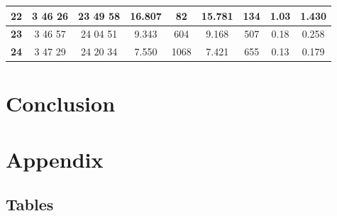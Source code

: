 \documentclass[12pt]{article}
\begin{document}
\begin{table}[H]
{\begin{tabular}{|c|c|c|c|c|c|c|c|c|}
        \textbf{22}   & 3  46  26                                                        & 23  49  58                                                         & 16.807     & 82                                                         & 15.781     & 134                                                        & 1.03         & 1.430                                                            \\ \hline
        \textbf{23}   & 3  46  57                                                        & 24  04  51                                                         & 9.343      & 604                                                        & 9.168      & 507                                                        & 0.18         & 0.258                                                            \\ \hline
        \textbf{24}   & 3  47  29                                                        & 24  20  34                                                         & 7.550      & 1068                                                       & 7.421      & 655                                                        & 0.13         & 0.179                                                            \\ \hline
        \end{tabular}
    }
    \label{tab:1}
\end{table}

\section{Conclusion} \label{sec:4}


\newpage



 \label{sec:ref}

\vspace{1.5cm}

\listoffigures

\listoftables

\newpage

\section*{Appendix} \label{sec:A}

\subsection*{Tables}
\end{document}
